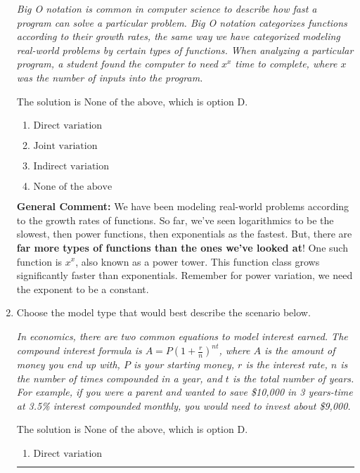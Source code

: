 \documentclass{extbook}[14pt]
\newcommand{\litem}[1]{\item #1

\rule{\textwidth}{0.4pt}}
\begin{document}
\begin{enumerate}
{\begin{center}
    \textit{ Big O notation is common in computer science to describe how fast a program can solve a particular problem. Big O notation categorizes functions according to their growth rates, the same way we have categorized modeling real-world problems by certain types of functions. When analyzing a particular program, a student found the computer to need $x^x$ time to complete, where $x$ was the number of inputs into the program. }
\end{center}
The solution is \( \text{None of the above} \), which is option D.\begin{enumerate}[label=\Alph*.]
\item \( \text{Direct variation} \)


\item \( \text{Joint variation} \)


\item \( \text{Indirect variation} \)


\item \( \text{None of the above} \)


\end{enumerate}

\textbf{General Comment:} We have been modeling real-world problems according to the growth rates of functions. So far, we've seen logarithmics to be the slowest, then power functions, then exponentials as the fastest. But, there are \textbf{far more types of functions than the ones we've looked at}! One such function is $x^x$, also known as a power tower. This function class grows significantly faster than exponentials. Remember for power variation, we need the exponent to be a constant.
}
\litem{
Choose the model type that would best describe the scenario below.

\begin{center}
    \textit{ In economics, there are two common equations to model interest earned. The compound interest formula is $A = P (1 + \frac{r}{n})^{nt}$, where $A$ is the amount of money you end up with, $P$ is your starting money, $r$ is the interest rate, $n$ is the number of times compounded in a year, and $t$ is the total number of years. For example, if you were a parent and wanted to save \$10,000 in 3 years-time at 3.5\% interest compounded monthly, you would need to invest about \$9,000. }
\end{center}
The solution is \( \text{None of the above} \), which is option D.\begin{enumerate}[label=\Alph*.]
\item \( \text{Direct variation} \)



\end{enumerate}}
\end{enumerate}
\end{document}
